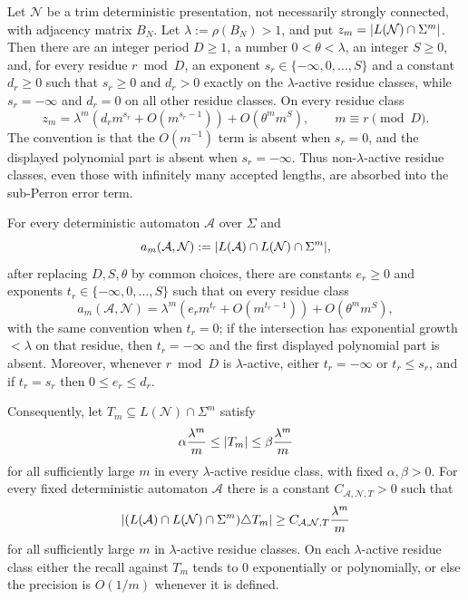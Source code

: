 \begin{theorem}
  \label{thm:multicomponent-finite-budget}
  Let \(\mathcal N\) be a trim deterministic presentation,
  not necessarily strongly connected, with adjacency matrix \(B_N\).
  Let \(\lambda:=\rho(B_N)>1\), and put
  \(z_m=\lvert L(\mathcal N)\cap\Sigma^m \rvert\). Then there are an integer
  period \(D\ge1\), a number \(0<\theta<\lambda\), an integer
  \(S\ge0\), and, for every residue \(r\bmod D\), an exponent
  \(s_r\in\{-\infty,0,\dots,S\}\) and a constant \(d_r\ge0\) such that
  \(s_r\ge0\) and \(d_r>0\) exactly on the \(\lambda\)-active residue
  classes, while \(s_r=-\infty\) and \(d_r=0\) on all other residue
  classes. On every residue class
  \[
    z_m
    =
    \lambda^m
    \left(
      d_r m^{s_r}
      +O(m^{s_r-1})
    \right)
    +O(\theta^m m^S),
    \qquad m\equiv r\pmod D .
  \]
  The convention is that the \(O(m^{-1})\) term is absent when
  \(s_r=0\), and the displayed polynomial part is absent when
  \(s_r=-\infty\). Thus non-\(\lambda\)-active residue classes, even
  those with infinitely many accepted lengths, are absorbed into the
  sub-Perron error term.

  For every deterministic automaton \(\mathcal A\) over \(\Sigma\) and
  \[
    a_m(\mathcal A,\mathcal N)
    :=\lvert L(\mathcal A)\cap L(\mathcal N)\cap\Sigma^m \rvert,
  \]
  after replacing \(D,S,\theta\) by common choices, there are
  constants \(e_r\ge0\) and exponents
  \(t_r\in\{-\infty,0,\dots,S\}\) such that on every residue class
  \[
    a_m(\mathcal A,\mathcal N)
    =
    \lambda^m
    \left(
      e_r m^{t_r}
      +O(m^{t_r-1})
    \right)
    +O(\theta^m m^S),
  \]
  with the same convention when \(t_r=0\); if the intersection has
  exponential growth \(<\lambda\) on that residue, then \(t_r=-\infty\)
  and the first displayed polynomial part is absent. Moreover, whenever
  \(r\bmod D\) is \(\lambda\)-active, either \(t_r=-\infty\) or
  \(t_r\le s_r\), and if \(t_r=s_r\) then \(0\le e_r\le d_r\).

  Consequently, let \(T_m\subseteq L(\mathcal N)\cap\Sigma^m\) satisfy
  \[
    \alpha\frac{\lambda^m}{m}
    \le \lvert T_m \rvert
    \le \beta\frac{\lambda^m}{m}
  \]
  for all sufficiently large \(m\) in every \(\lambda\)-active residue
  class, with fixed \(\alpha,\beta>0\). For every fixed deterministic automaton
  \(\mathcal A\) there is a constant
  \(C_{\mathcal A,\mathcal N,T}>0\) such that
  \[
    \lvert (L(\mathcal A)\cap L(\mathcal N)\cap\Sigma^m)\triangle T_m \rvert
    \ge
    C_{\mathcal A,\mathcal N,T}\frac{\lambda^m}{m}
  \]
  for all sufficiently large \(m\) in \(\lambda\)-active residue
  classes. On each \(\lambda\)-active residue class either the recall
  against \(T_m\) tends to \(0\) exponentially or polynomially, or else
  the precision is \(O(1/m)\) whenever it is defined.
\end{theorem}

